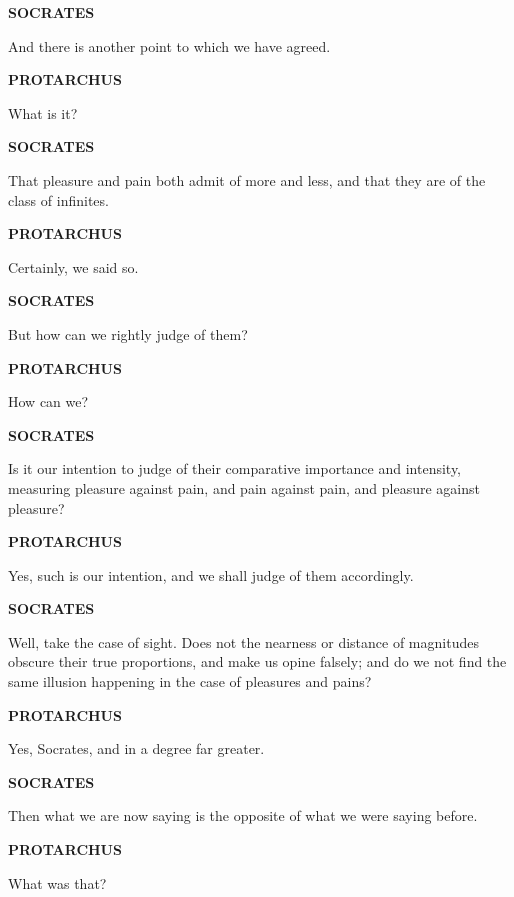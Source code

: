 \documentclass[11pt,letter]{article}
\begin{document}
\par \textbf{SOCRATES}
\par   And there is another point to which we have agreed.

\par \textbf{PROTARCHUS}
\par   What is it?

\par \textbf{SOCRATES}
\par   That pleasure and pain both admit of more and less, and that they are of the class of infinites.

\par \textbf{PROTARCHUS}
\par   Certainly, we said so.

\par \textbf{SOCRATES}
\par   But how can we rightly judge of them?

\par \textbf{PROTARCHUS}
\par   How can we?

\par \textbf{SOCRATES}
\par   Is it our intention to judge of their comparative importance and intensity, measuring pleasure against pain, and pain against pain, and pleasure against pleasure?

\par \textbf{PROTARCHUS}
\par   Yes, such is our intention, and we shall judge of them accordingly.

\par \textbf{SOCRATES}
\par   Well, take the case of sight. Does not the nearness or distance of magnitudes obscure their true proportions, and make us opine falsely; and do we not find the same illusion happening in the case of pleasures and pains?

\par \textbf{PROTARCHUS}
\par   Yes, Socrates, and in a degree far greater.

\par \textbf{SOCRATES}
\par   Then what we are now saying is the opposite of what we were saying before.

\par \textbf{PROTARCHUS}
\par   What was that?
\end{document}
